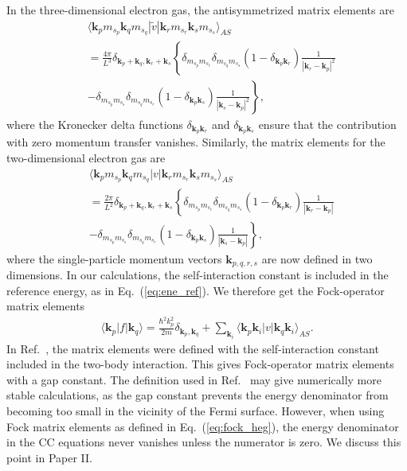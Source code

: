 \documentclass[a4paper,12pt]{report}
\begin{document}
In the three-dimensional electron gas, the antisymmetrized
matrix elements are
\begin{align} \label{eq:vmat_3dheg}
  & \langle \mathbf{k}_{p}m_{s_{p}}\mathbf{k}_{q}m_{s_{q}}
  |\tilde{v}|\mathbf{k}_{r}m_{s_{r}}\mathbf{k}_{s}m_{s_{s}}\rangle_{AS} 
  \nonumber \\
  & = \frac{4\pi }{L^{3}}\delta_{\mathbf{k}_{p}+\mathbf{k}_{q},
    \mathbf{k}_{r}+\mathbf{k}_{s}}\left\{ 
  \delta_{m_{s_{p}}m_{s_{r}}}\delta_{m_{s_{q}}m_{s_{s}}}
  \left( 1 - \delta_{\mathbf{k}_{p}\mathbf{k}_{r}}\right) 
  \frac{1}{|\mathbf{k}_{r}-\mathbf{k}_{p}|^{2}}
  \right. \nonumber \\
  & \left. - \delta_{m_{s_{p}}m_{s_{s}}}\delta_{m_{s_{q}}m_{s_{r}}}
  \left( 1 - \delta_{\mathbf{k}_{p}\mathbf{k}_{s}} \right)
  \frac{1}{|\mathbf{k}_{s}-\mathbf{k}_{p}|^{2}} 
  \right\} ,
\end{align}
where the Kronecker delta functions 
$\delta_{\mathbf{k}_{p}\mathbf{k}_{r}}$ and
$\delta_{\mathbf{k}_{p}\mathbf{k}_{s}}$ ensure that the 
contribution with zero momentum transfer vanishes.
Similarly, the matrix elements for the two-dimensional
electron gas are
\begin{align} \label{eq:vmat_2dheg}
  & \langle \mathbf{k}_{p}m_{s_{p}}\mathbf{k}_{q}m_{s_{q}}
  |v|\mathbf{k}_{r}m_{s_{r}}\mathbf{k}_{s}m_{s_{s}}\rangle_{AS} 
  \nonumber \\
  & = \frac{2\pi }{L^{2}}
  \delta_{\mathbf{k}_{p}+\mathbf{k}_{q},\mathbf{k}_{r}+\mathbf{k}_{s}}
  \left\{ \delta_{m_{s_{p}}m_{s_{r}}}\delta_{m_{s_{q}}m_{s_{s}}} 
  \left( 1 - \delta_{\mathbf{k}_{p}\mathbf{k}_{r}}\right)
  \frac{1}{
    |\mathbf{k}_{r}-\mathbf{k}_{p}|} \right.
  \nonumber \\
  & - \left. \delta_{m_{s_{p}}m_{s_{s}}}\delta_{m_{s_{q}}m_{s_{r}}}
  \left( 1 - \delta_{\mathbf{k}_{p}\mathbf{k}_{s}}\right)
  \frac{1}{ 
    |\mathbf{k}_{s}-\mathbf{k}_{p}|}
  \right\} ,
\end{align}
where the single-particle momentum vectors $\mathbf{k}_{p,q,r,s}$
are now defined in two dimensions. In our calculations, the 
self-interaction constant is included in the reference 
energy, as in Eq.~(\ref{eq:ene_ref}). We therefore get the 
Fock-operator matrix elements 
\begin{align}
  \langle \mathbf{k}_{p}|f|\mathbf{k}_{q} \rangle
  = \frac{\hbar^{2}k_{p}^{2}}{2m}\delta_{\mathbf{k}_{p},
  \mathbf{k}_{q}} + \sum_{\mathbf{k}_{i}}\langle 
  \mathbf{k}_{p}\mathbf{k}_{i}|v|\mathbf{k}_{q}
  \mathbf{k}_{i}\rangle_{AS}.
  \label{eq:fock_heg}
\end{align}
In Ref.~\cite{shepherd2013b}, the matrix elements were 
defined with the self-interaction constant included in the
two-body interaction. This gives Fock-operator matrix 
elements with a gap constant. The definition used in 
Ref.~\cite{shepherd2013b} may give numerically more
stable calculations, as the gap constant 
prevents the energy denominator from becoming too small
in the vicinity of the Fermi surface. However, when using
Fock matrix elements as defined in Eq.~(\ref{eq:fock_heg}), 
the energy denominator in the CC equations never vanishes 
unless the numerator is zero. We discuss this point in 
Paper II.
\end{document}
